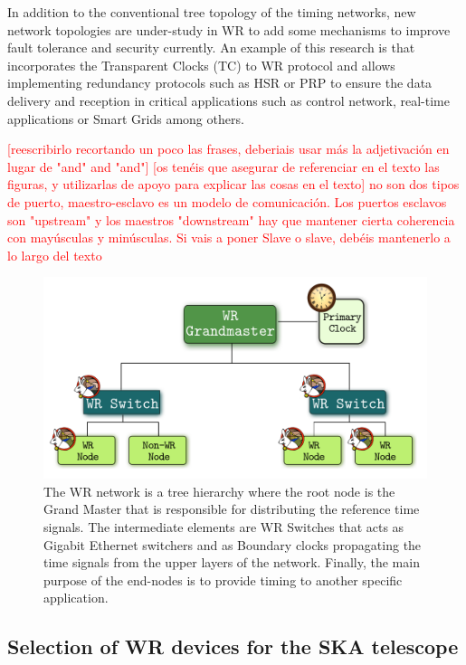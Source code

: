 In addition to the conventional tree topology of the timing networks, new network topologies are under-study in WR to add some mechanisms to improve fault tolerance and security currently. An example of this research is \cite{jlgutierrez-paper-redundancy} that incorporates the Transparent Clocks (TC) to WR protocol and allows implementing redundancy protocols such as HSR or PRP to ensure the data delivery and reception in critical applications such as control network, real-time applications or Smart Grids among others.

\textcolor{red}{[reescribirlo recortando un poco las frases, deberiais usar más la adjetivación en lugar de "and" and "and"]}
\textcolor{red}{[os tenéis que asegurar de referenciar en el texto las figuras, y utilizarlas de apoyo para explicar las cosas en el texto]}
\textcolor{red}{no son dos tipos de puerto, maestro-esclavo es un modelo de comunicación. Los puertos esclavos son "upstream" y los maestros "downstream"}
\textcolor{red}{hay que mantener cierta coherencia con mayúsculas y minúsculas. Si vais a poner Slave o slave, debéis mantenerlo a lo largo del texto}

\begin{figure}[H]
	\centering
	\includegraphics[scale=0.4]{img/wr_hierarchy}
	\caption{The WR network is a tree hierarchy where the root node is the Grand Master that is responsible for distributing the reference time signals. The intermediate elements are WR Switches that acts as Gigabit Ethernet switchers and as Boundary clocks propagating the time signals from the upper layers of the network. Finally, the main purpose of the end-nodes is to provide timing to another specific application.}
	\label{fig:wr_hierarchy}
\end{figure}

\subsection{Selection of WR devices for the SKA telescope} 
\label{subsec:wr-dev}

